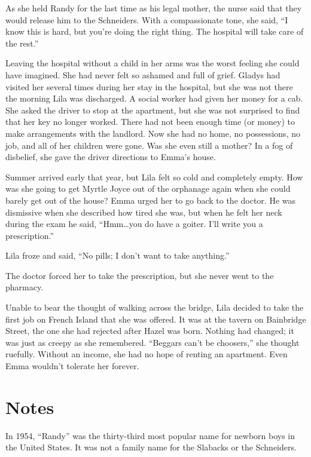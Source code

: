 \documentclass[
  letterpaper,
]{book}
\begin{document}
As she held Randy for the last time as his legal mother, the nurse said
that they would release him to the Schneiders. With a compassionate
tone, she said, ``I know this is hard, but you're doing the right thing.
The hospital will take care of the rest.''

Leaving the hospital without a child in her arms was the worst feeling
she could have imagined. She had never felt so ashamed and full of
grief. Gladys had visited her several times during her stay in the
hospital, but she was not there the morning Lila was discharged. A
social worker had given her money for a cab. She asked the driver to
stop at the apartment, but she was not surprised to find that her key no
longer worked. There had not been enough time (or money) to make
arrangements with the landlord. Now she had no home, no possessions, no
job, and all of her children were gone. Was she even still a mother? In
a fog of disbelief, she gave the driver directions to Emma's house.

Summer arrived early that year, but Lila felt so cold and completely
empty. How was she going to get Myrtle Joyce out of the orphanage again
when she could barely get out of the house? Emma urged her to go back to
the doctor. He was dismissive when she described how tired she was, but
when he felt her neck during the exam he said, ``Hmm\ldots you do have a
goiter. I'll write you a prescription.''

Lila froze and said, ``No pills; I don't want to take anything.''

The doctor forced her to take the prescription, but she never went to
the pharmacy.

Unable to bear the thought of walking across the bridge, Lila decided to
take the first job on French Island that she was offered. It was at the
tavern on Bainbridge Street, the one she had rejected after Hazel was
born. Nothing had changed; it was just as creepy as she remembered.
``Beggars can't be choosers,'' she thought ruefully. Without an income,
she had no hope of renting an apartment. Even Emma wouldn't tolerate her
forever.

\section{Notes}\label{notes-57}

In 1954, ``Randy'' was the thirty-third most popular name for newborn
boys in the United States. It was not a family name for the Slabacks or
the Schneiders.
\end{document}
